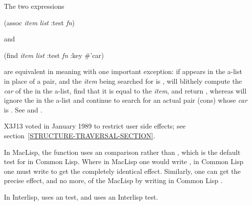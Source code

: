 \begin{defun}[Function]
The two expressions
\begin{lisp}
(assoc {\it item} {\it list} :test {\it fn})
\end{lisp}
and
\begin{lisp}
(find {\it item} {\it list} :test {\it fn} :key \#'car)
\end{lisp}
are equivalent in meaning with one important exception:
if {\nil} appears in the a-list in place of a pair,
and the {\it item} being searched for is {\nil},
 will blithely compute the {\it car} of the {\nil} in the a-list,
find that it is equal to the {\it item}, and return {\nil},
whereas  will ignore the {\nil} in the a-list and continue
to search for an actual pair (cons) whose {\it car} is {\nil}.
See  and .

\begin{new}
X3J13 voted in January 1989
to restrict user side effects; see section~\ref{STRUCTURE-TRAVERSAL-SECTION}.
\end{new}

\beforenoterule
\begin{incompatibility}
In MacLisp, the  function uses
an  comparison rather than , which is the default
test for  in Common Lisp.  Where in MacLisp one would write
, in Common Lisp one must write 
to get the completely identical effect.  Similarly, one can get the
precise effect, and no more, of the MacLisp 
by writing in Common Lisp .

In Interlisp,  uses an  test, and 
uses an Interlisp  test.
\end{incompatibility}
\afternoterule
\end{defun}

